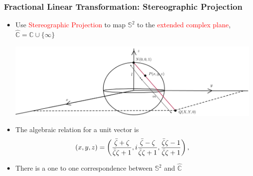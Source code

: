\documentclass[10pt,a4paper]{beamer}
\begin{document}
\begin{frame}
\frametitle{Fractional Linear Transformation: Stereographic Projection}
\begin{itemize}
\item<1->{Use \textcolor{red}{Stereographic Projection} to map $\mathbb{S}^2$ to the \textcolor{red}{extended complex plane}, $\hat{\mathbb{C}} = \mathbb{C} \cup \{ \infty \}$

\includegraphics[scale=0.35]{../Tex/figs/4_1.jpg}
}
\item<3->{The algebraic relation for a unit vector is
\begin{equation*}
(x, y, z) = \begin{Huge} \left( \frac{\bar{\zeta} + \zeta}{\bar{\zeta}\zeta + 1}  ,i\frac{\bar{\zeta} - \zeta}{\bar{\zeta}\zeta + 1}, \frac{\bar{\zeta}\zeta - 1}{\bar{\zeta}\zeta + 1}  \right),
\end{Huge}
\end{equation*}
}
\item<4->{There is a one to one correspondence between $\mathbb{S}^2$ and $\hat{\mathbb{C}}$}
\end{itemize}

\end{frame}
\end{document}
